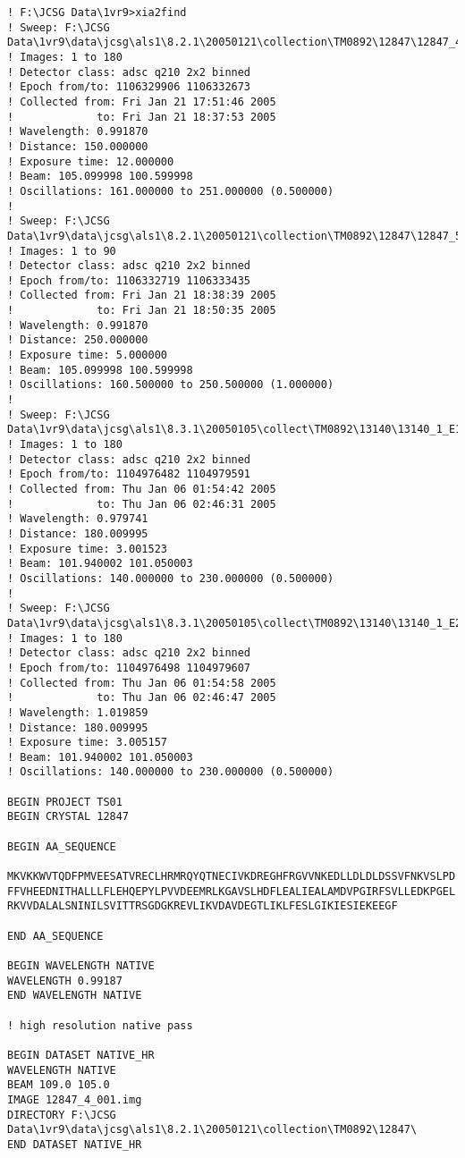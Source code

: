 \documentclass[a4paper, 11pt]{article}
\begin{document}
{
\small
\begin{verbatim}
! F:\JCSG Data\1vr9>xia2find
! Sweep: F:\JCSG Data\1vr9\data\jcsg\als1\8.2.1\20050121\collection\TM0892\12847\12847_4_###.img
! Images: 1 to 180
! Detector class: adsc q210 2x2 binned
! Epoch from/to: 1106329906 1106332673
! Collected from: Fri Jan 21 17:51:46 2005
!             to: Fri Jan 21 18:37:53 2005
! Wavelength: 0.991870
! Distance: 150.000000
! Exposure time: 12.000000
! Beam: 105.099998 100.599998
! Oscillations: 161.000000 to 251.000000 (0.500000)
! 
! Sweep: F:\JCSG Data\1vr9\data\jcsg\als1\8.2.1\20050121\collection\TM0892\12847\12847_5_###.img
! Images: 1 to 90
! Detector class: adsc q210 2x2 binned
! Epoch from/to: 1106332719 1106333435
! Collected from: Fri Jan 21 18:38:39 2005
!             to: Fri Jan 21 18:50:35 2005
! Wavelength: 0.991870
! Distance: 250.000000
! Exposure time: 5.000000
! Beam: 105.099998 100.599998
! Oscillations: 160.500000 to 250.500000 (1.000000)
! 
! Sweep: F:\JCSG Data\1vr9\data\jcsg\als1\8.3.1\20050105\collect\TM0892\13140\13140_1_E1_###.img
! Images: 1 to 180
! Detector class: adsc q210 2x2 binned
! Epoch from/to: 1104976482 1104979591
! Collected from: Thu Jan 06 01:54:42 2005
!             to: Thu Jan 06 02:46:31 2005
! Wavelength: 0.979741
! Distance: 180.009995
! Exposure time: 3.001523
! Beam: 101.940002 101.050003
! Oscillations: 140.000000 to 230.000000 (0.500000)
! 
! Sweep: F:\JCSG Data\1vr9\data\jcsg\als1\8.3.1\20050105\collect\TM0892\13140\13140_1_E2_###.img
! Images: 1 to 180
! Detector class: adsc q210 2x2 binned
! Epoch from/to: 1104976498 1104979607
! Collected from: Thu Jan 06 01:54:58 2005
!             to: Thu Jan 06 02:46:47 2005
! Wavelength: 1.019859
! Distance: 180.009995
! Exposure time: 3.005157
! Beam: 101.940002 101.050003
! Oscillations: 140.000000 to 230.000000 (0.500000)

BEGIN PROJECT TS01
BEGIN CRYSTAL 12847

BEGIN AA_SEQUENCE

MKVKKWVTQDFPMVEESATVRECLHRMRQYQTNECIVKDREGHFRGVVNKEDLLDLDLDSSVFNKVSLPD
FFVHEEDNITHALLLFLEHQEPYLPVVDEEMRLKGAVSLHDFLEALIEALAMDVPGIRFSVLLEDKPGEL
RKVVDALALSNINILSVITTRSGDGKREVLIKVDAVDEGTLIKLFESLGIKIESIEKEEGF

END AA_SEQUENCE

BEGIN WAVELENGTH NATIVE
WAVELENGTH 0.99187
END WAVELENGTH NATIVE

! high resolution native pass

BEGIN DATASET NATIVE_HR
WAVELENGTH NATIVE
BEAM 109.0 105.0
IMAGE 12847_4_001.img
DIRECTORY F:\JCSG Data\1vr9\data\jcsg\als1\8.2.1\20050121\collection\TM0892\12847\
END DATASET NATIVE_HR


\end{verbatim}}
\end{document}
